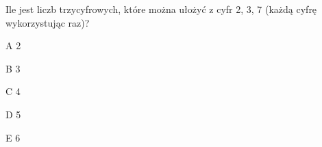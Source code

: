 \begin{tresc}
Ile jest liczb trzycyfrowych, które można ułożyć z cyfr 2, 3, 7 (każdą cyfrę wykorzystując raz)?
\end{tresc}
\begin{wariant}{A} 2 \end{wariant}
\begin{wariant}{B} 3 \end{wariant}
\begin{wariant}{C} 4 \end{wariant}
\begin{wariant}{D} 5 \end{wariant}
\begin{wariant}{E} 6 \end{wariant}
